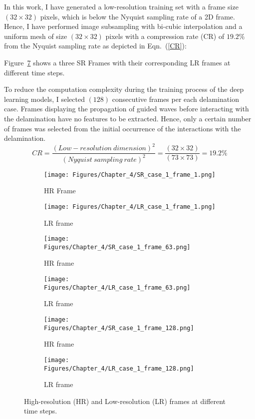 In this work, I have generated a low-resolution training set with a frame size \((32\times32)\) pixels, which is below the Nyquist sampling rate of a 2D frame.
Hence, I have performed image subsampling with bi-cubic interpolation and a uniform mesh of size \((32\times32)\) pixels with a compression rate (CR) of \(19.2\%\) from the Nyquist sampling rate as depicted in Eqn.~(\ref{CR}):

Figure~\ref{fig:SR_LR} shows a three SR Frames with their corresponding LR frames at different time steps.

To reduce the computation complexity during the training process of the deep learning models, I selected \((128)\) consecutive frames per each delamination case.
Frames display\-ing the propagation of guided waves before interacting with the delamination have no features to be extracted. 
Hence, only a certain number of frames was selected from the initial occurrence of the interactions with the delamination.
\begin{equation}
	CR = \frac{(Low-resolution\ dimension)^2}{(Nyquist\ sampling\ rate)^2} = \frac{(32\times32)}{(73\times73)}=19.2\%
	\label{CR}
\end{equation}
\begin{figure} [!h]
	\centering
	\begin{subfigure}[b]{.48\textwidth}
		\centering
		\texttt{[image: Figures/Chapter\_4/SR\_case\_1\_frame\_1.png]}
		\caption{HR Frame}
		\label{fig:SR_1}
	\end{subfigure}
	\hfill
	\begin{subfigure}[b]{.48\textwidth}
		\centering
		\texttt{[image: Figures/Chapter\_4/LR\_case\_1\_frame\_1.png]}
		\caption{LR frame}
		\label{fig:LR_1}	
	\end{subfigure}
	\hfill
	\begin{subfigure}[b]{.48\textwidth}
		\centering
		\texttt{[image: Figures/Chapter\_4/SR\_case\_1\_frame\_63.png]}
		\caption{HR frame}
		\label{fig:SR_2}
	\end{subfigure}
	\hfill
	\begin{subfigure}[b]{.48\textwidth}
		\centering
		\texttt{[image: Figures/Chapter\_4/LR\_case\_1\_frame\_63.png]}
		\caption{LR frame}
		\label{fig:LR_2}	
	\end{subfigure}
	\hfill
	\begin{subfigure}[b]{.48\textwidth}
		\centering
		\texttt{[image: Figures/Chapter\_4/SR\_case\_1\_frame\_128.png]}
		\caption{HR frame}
		\label{fig:SR_3}
	\end{subfigure}
	\hfill
	\begin{subfigure}[b]{.48\textwidth}
		\centering
		\texttt{[image: Figures/Chapter\_4/LR\_case\_1\_frame\_128.png]}
		\caption{LR frame}
		\label{fig:LR_3}	
	\end{subfigure}
	\caption{High-resolution (HR) and Low-resolution (LR) frames at different time steps.}
	\label{fig:SR_LR}
\end{figure}
\newpage

